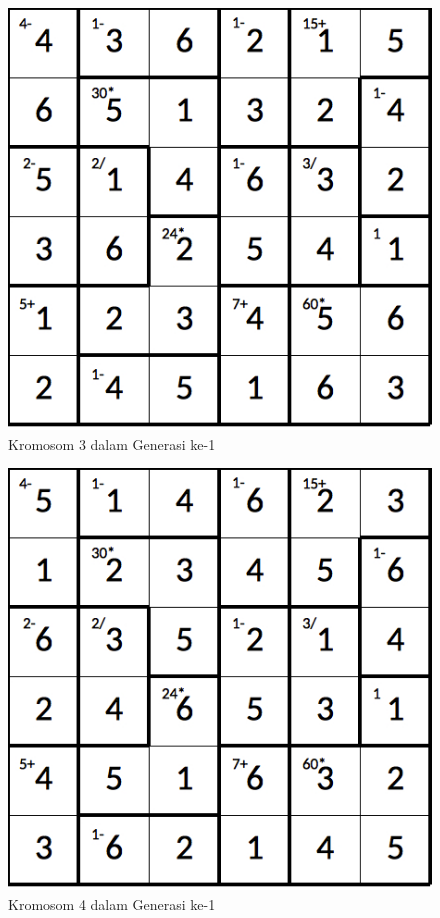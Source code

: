 \documentclass[a4paper,twoside]{article}
\begin{document}
\begin{enumerate}
\begin{figure}
\centering
\captionsetup{justification=centering}
\includegraphics[scale=0.333]{Gambar/hybridgenetic/Generation1Chromosome3}
\caption[Kromosom 3 dalam Generasi ke-1]{Kromosom 3 dalam Generasi ke-1}
\label{fig:analisisg1k3}
\end{figure}

\begin{figure}
\centering
\captionsetup{justification=centering}
\includegraphics[scale=0.333]{Gambar/hybridgenetic/Generation1Chromosome4}
\caption[Kromosom 4 dalam Generasi ke-1]{Kromosom 4 dalam Generasi ke-1}
\label{fig:analisisg1k4}
\end{figure}


\end{enumerate}
\end{document}
